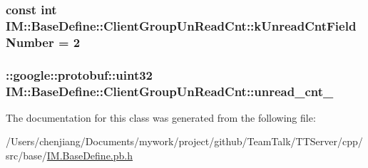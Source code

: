 \subsubsection[{k\+Unread\+Cnt\+Field\+Number}]{\setlength{\rightskip}{0pt plus 5cm}const int I\+M\+::\+Base\+Define\+::\+Client\+Group\+Un\+Read\+Cnt\+::k\+Unread\+Cnt\+Field\+Number = 2\hspace{0.3cm}{\ttfamily [static]}}\label{class_i_m_1_1_base_define_1_1_client_group_un_read_cnt_a1385672b9f1396276fd9f08ec9529f4c}
\hypertarget{class_i_m_1_1_base_define_1_1_client_group_un_read_cnt_a6b366050e78199d76be4445c5ca3a397}{}
\subsubsection[{unread\+\_\+cnt\+\_\+}]{\setlength{\rightskip}{0pt plus 5cm}\+::google\+::protobuf\+::uint32 I\+M\+::\+Base\+Define\+::\+Client\+Group\+Un\+Read\+Cnt\+::unread\+\_\+cnt\+\_\+\hspace{0.3cm}{\ttfamily [private]}}\label{class_i_m_1_1_base_define_1_1_client_group_un_read_cnt_a6b366050e78199d76be4445c5ca3a397}


The documentation for this class was generated from the following file\+:\begin{DoxyCompactItemize}
\item 
/\+Users/chenjiang/\+Documents/mywork/project/github/\+Team\+Talk/\+T\+T\+Server/cpp/src/base/\hyperlink{_i_m_8_base_define_8pb_8h}{I\+M.\+Base\+Define.\+pb.\+h}\end{DoxyCompactItemize}

